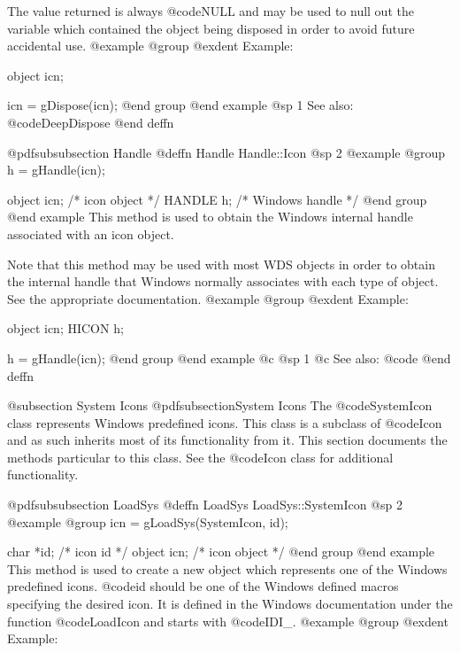 The value returned is always @code{NULL} and may be used to null out
the variable which contained the object being disposed in order to
avoid future accidental use.
@example
@group
@exdent Example:

object  icn;

icn = gDispose(icn);
@end group
@end example
@sp 1
See also:  @code{DeepDispose}
@end deffn










@pdfsubsubsection {Handle}
@deffn {Handle} Handle::Icon
@sp 2
@example
@group
h = gHandle(icn);

object  icn;    /*  icon object     */
HANDLE  h;      /*  Windows handle  */
@end group
@end example
This method is used to obtain the Windows internal handle associated with
an icon object.  

Note that this method may be used with most WDS objects in order to obtain
the internal handle that Windows normally associates with each type of object.
See the appropriate documentation.
@example
@group
@exdent Example:

object  icn;
HICON   h;

h = gHandle(icn);
@end group
@end example
@c @sp 1
@c See also:  @code{}
@end deffn









@subsection System Icons
@pdfsubsection{System Icons}
The @code{SystemIcon} class represents Windows predefined icons.
This class is a subclass of @code{Icon} and as such inherits most
of its functionality from it.  This section documents the methods
particular to this class.  See the @code{Icon} class for additional
functionality.











@pdfsubsubsection {LoadSys}
@deffn {LoadSys} LoadSys::SystemIcon
@sp 2
@example
@group
icn = gLoadSys(SystemIcon, id);

char    *id;    /*  icon id      */
object  icn;    /*  icon object  */
@end group
@end example
This method is used to create a new object which represents one of the
Windows predefined icons.  @code{id} should be one of the Windows
defined macros specifying the desired icon.  It is defined in the
Windows documentation under the function @code{LoadIcon} and
starts with @code{IDI_}.
@example
@group
@exdent Example:

